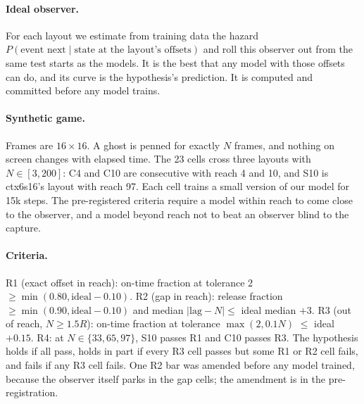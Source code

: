 \documentclass[11pt]{article}
\begin{document}
\paragraph{Ideal observer.} For each layout we estimate from training data the hazard
$P(\text{event next}\mid\text{state at the layout's offsets})$ and roll this observer out from the same test starts
as the models. It is the best that any model with those offsets can do, and its curve is the hypothesis's prediction. It
is computed and committed before any model trains.

\paragraph{Synthetic game.} Frames are $16\times16$. A ghost is penned for exactly $N$ frames, and nothing on screen
changes with elapsed time. The 23 cells cross three layouts with $N\in[3,200]$: C4 and C10 are consecutive with
reach 4 and 10, and S10 is ctx6s16's layout with reach 97. Each cell trains a small version of our model for 15k
steps. The pre-registered criteria require a model within reach to come close to the observer, and a model beyond
reach not to beat an observer blind to the capture.

\paragraph{Criteria.} R1 (exact offset in reach): on-time fraction at tolerance 2 $\ge\min(0.80,\text{ideal}-0.10)$.
R2 (gap in reach): release fraction $\ge\min(0.90,\text{ideal}-0.10)$ and median $|\text{lag}-N|\le$ ideal median
$+3$. R3 (out of reach, $N\ge1.5R$): on-time fraction at tolerance $\max(2,0.1N)$ $\le$ ideal $+0.15$. R4: at
$N\in\{33,65,97\}$, S10 passes R1 and C10 passes R3. The hypothesis holds if all pass, holds in part if every R3
cell passes but some R1 or R2 cell fails, and fails if any R3 cell fails. One R2 bar was amended before any model
trained, because the observer itself parks in the gap cells; the amendment is in the pre-registration.
\end{document}

